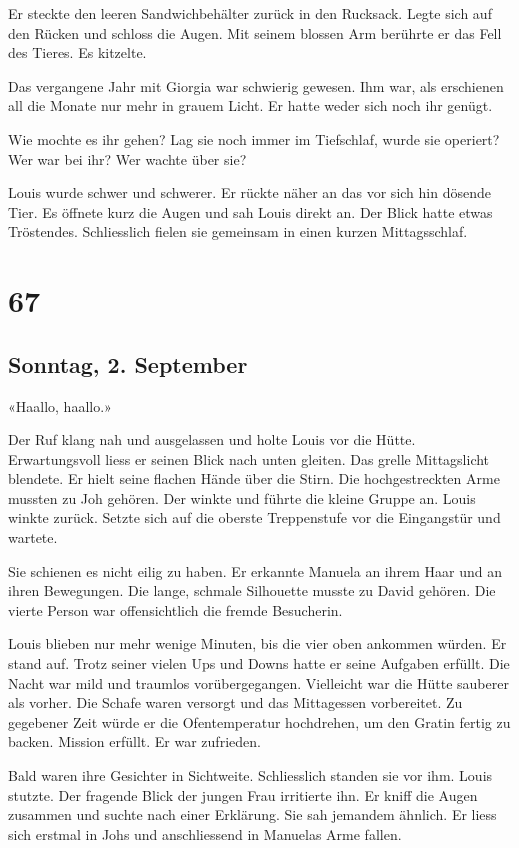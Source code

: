 Er steckte den leeren Sandwichbehälter zurück in den Rucksack. Legte
sich auf den Rücken und schloss die Augen. Mit seinem blossen Arm
berührte er das Fell des Tieres. Es kitzelte.

Das vergangene Jahr mit Giorgia war schwierig gewesen. Ihm war, als
erschienen all die Monate nur mehr in grauem Licht. Er hatte weder sich
noch ihr genügt.

Wie mochte es ihr gehen? Lag sie noch immer im Tiefschlaf, wurde sie
operiert? Wer war bei ihr? Wer wachte über sie?

Louis wurde schwer und schwerer. Er rückte näher an das vor sich hin
dösende Tier. Es öffnete kurz die Augen und sah Louis direkt an. Der
Blick hatte etwas Tröstendes. Schliesslich fielen sie gemeinsam in einen
kurzen Mittagsschlaf.

\chapter{67}\label{section-67}

\section{Sonntag, 2. September}\label{sonntag-2.-september}

«Haallo, haallo.»

Der Ruf klang nah und ausgelassen und holte Louis vor die Hütte.
Erwartungsvoll liess er seinen Blick nach unten gleiten. Das grelle
Mittagslicht blendete. Er hielt seine flachen Hände über die Stirn. Die
hochgestreckten Arme mussten zu Joh gehören. Der winkte und führte die
kleine Gruppe an. Louis winkte zurück. Setzte sich auf die oberste
Treppenstufe vor die Eingangstür und wartete.

Sie schienen es nicht eilig zu haben. Er erkannte Manuela an ihrem Haar
und an ihren Bewegungen. Die lange, schmale Silhouette musste zu David
gehören. Die vierte Person war offensichtlich die fremde Besucherin.

Louis blieben nur mehr wenige Minuten, bis die vier oben ankommen
würden. Er stand auf. Trotz seiner vielen Ups und Downs hatte er seine
Aufgaben erfüllt. Die Nacht war mild und traumlos vorübergegangen.
Vielleicht war die Hütte sauberer als vorher. Die Schafe waren versorgt
und das Mittagessen vorbereitet. Zu gegebener Zeit würde er die
Ofentemperatur hochdrehen, um den Gratin fertig zu backen. Mission
erfüllt. Er war zufrieden.

Bald waren ihre Gesichter in Sichtweite. Schliesslich standen sie vor
ihm. Louis stutzte. Der fragende Blick der jungen Frau irritierte ihn.
Er kniff die Augen zusammen und suchte nach einer Erklärung. Sie sah
jemandem ähnlich. Er liess sich erstmal in Johs und anschliessend in
Manuelas Arme fallen.


